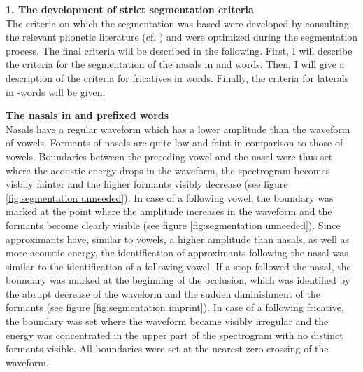 \textbf{1. The development of strict segmentation criteria}\\

The criteria on which the segmentation was based were developed by consulting  the relevant phonetic literature (cf. \citealt{Ladefoged.1996,Johnson.1997b,Ladefoged.2003,Machac.2009,Ladefoged.2011}) and were optimized during the segmentation process. The final criteria will be described in the following. First, I will describe the criteria for the segmentation of the nasals in  and words. Then, I will give a description of the criteria for fricatives in words. Finally, the criteria for laterals in -words will be given.\\

\clearpage

\textbf{The nasals in  and prefixed words}\\

Nasals have a regular waveform which has a lower amplitude than the waveform of vowels. Formants of nasals are quite low and faint in comparison to those of vowels. Boundaries between the preceding vowel and the nasal were thus set where the acoustic energy drops in the waveform, the spectrogram becomes visbily fainter and the higher formants visibly decrease (see figure \ref{fig:segmentation unneeded}). In case of a following vowel, the boundary was marked at the point where the amplitude increases in the waveform and the formants become clearly visible (see figure \ref{fig:segmentation unneeded}).  Since approximants have, similar to vowels,  a higher amplitude than nasals, as well as more acoustic energy, the identification of approximants following the nasal was similar to the identification of a following vowel. If a stop followed the nasal, the boundary was marked at the beginning of the occlusion, which was identified by the abrupt decrease of the waveform and the sudden diminishment of the formants (see figure \ref{fig:segmentation imprint}). In case of a following fricative, the boundary was set where the waveform became visibly irregular and the energy was concentrated in the upper part of the spectrogram with no distinct formants visible. All boundaries were set at the nearest zero crossing of the waveform.\\



